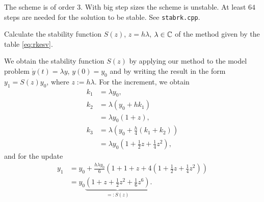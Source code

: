 \begin{problem}
\begin{subproblem}[1]
\cprotEnv \begin{solution}
The scheme is of order $3$. With big step sizes the scheme is unstable. At least $64$ steps are needed for the solution to be stable. See \verb|stabrk.cpp|.
\end{solution}
\end{subproblem}
	
\begin{subproblem}[1]
	Calculate the stability function $S(z)$, $z= h\lambda$, $\lambda \in \mathbb{C}$ of the method given by the table \eqref{eq:rkesv}.
	
	\cprotEnv \begin{solution}
	We obtain the stability function $S(z)$ by applying our method to the model problem $\dot{y}(t) = \lambda y$, $y(0) = y_0$ and by writing the result in the form $y_1 = S(z)y_0$, where $z:= h\lambda$. For the increment, we obtain
	   \begin{align*}
      k_1 &= \lambda y_0,\\
      k_2 &= \lambda(y_0 + hk_1)\\
      &= \lambda y_0(1 + z),\\
      k_3 &= \lambda(y_0 + \tfrac{h}{4}(k_1 + k_2))\\
      &= \lambda y_0(1 + \tfrac{1}{2}z + \tfrac{1}{4}z^2),
    \end{align*}
		and for the update
		\begin{align*}
      y_1 &= y_0 + \frac{h\lambda y_0}{6}\left(1 + 1 + z + 4\left(1 +
          \frac{1}{2}z +
          \frac{1}{4}z^2\right)\right)\\
      &= y_0\underbrace{\left(1 + z + \frac{1}{2}z^2 +
          \frac{1}{6}z^6\right)}_{=:S(z)}.
    \end{align*}
\end{solution}
	
\end{subproblem}
	

\end{problem}
